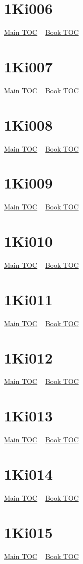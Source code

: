 \documentclass{book}
\begin{document}
  \section{1Ki006}\hyperlink{toc}{Main TOC} ~ \hyperref[subsec:1Ki]{Book TOC} 
  \section{1Ki007}\hyperlink{toc}{Main TOC} ~ \hyperref[subsec:1Ki]{Book TOC} 
  \section{1Ki008}\hyperlink{toc}{Main TOC} ~ \hyperref[subsec:1Ki]{Book TOC} 
  \section{1Ki009}\hyperlink{toc}{Main TOC} ~ \hyperref[subsec:1Ki]{Book TOC} 
  \section{1Ki010}\hyperlink{toc}{Main TOC} ~ \hyperref[subsec:1Ki]{Book TOC} 
  \section{1Ki011}\hyperlink{toc}{Main TOC} ~ \hyperref[subsec:1Ki]{Book TOC} 
  \section{1Ki012}\hyperlink{toc}{Main TOC} ~ \hyperref[subsec:1Ki]{Book TOC} 
  \section{1Ki013}\hyperlink{toc}{Main TOC} ~ \hyperref[subsec:1Ki]{Book TOC} 
  \section{1Ki014}\hyperlink{toc}{Main TOC} ~ \hyperref[subsec:1Ki]{Book TOC} 
  \section{1Ki015}\hyperlink{toc}{Main TOC} ~ \hyperref[subsec:1Ki]{Book TOC} 
\end{document}
